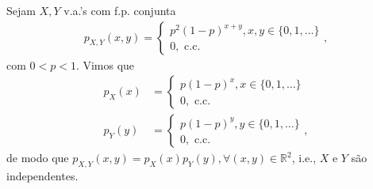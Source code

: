 \documentclass[../Notas.tex]{subfiles}
\begin{document}
\begin{example}
Sejam $X, Y$ v.a.'s com f.p. conjunta
\begin{align*}
    p_{X, Y}(x,y) = \begin{cases}
    p^2(1-p)^{x+y}, x,y\in\{0,1,\dots\} \\
    0, \text{ c.c.}
    \end{cases},
\end{align*}
com $0<p<1$. Vimos que
\begin{align*}
    p_X(x) &= \begin{cases}
    p(1-p)^x, x\in\{0,1,\dots\} \\
    0, \text{ c.c.}
    \end{cases} \\
    p_Y(y) &= \begin{cases}
    p(1-p)^y, y\in\{0,1,\dots\} \\
    0, \text{ c.c.}
    \end{cases},
\end{align*}
de modo que $p_{X,Y}(x,y) = p_X(x)p_Y(y), \forall (x,y)\in\mathbb{R}^2$, i.e., $X$ e $Y$ são independentes.
\end{example}
\end{document}
